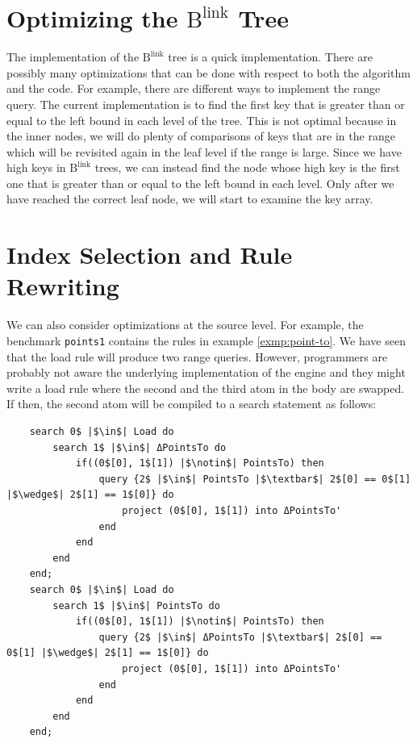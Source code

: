 \documentclass[11pt]{report}
\theoremstyle{definition}
\begin{document}
\section{Optimizing the $\text{B}^{\text{link}}$ Tree}

The implementation of the $\text{B}^{\text{link}}$ tree is a quick implementation. There are possibly many optimizations that can be done with respect to both the algorithm and the code. For example, there are different ways to implement the range query. The current implementation is to find the first key that is greater than or equal to the left bound in each level of the tree. This is not optimal because in the inner nodes, we will do plenty of comparisons of keys that are in the range which will be revisited again in the leaf level if the range is large. Since we have high keys in $\text{B}^{\text{link}}$ trees, we can instead find the node whose high key is the first one that is greater than or equal to the left bound in each level. Only after we have reached the correct leaf node, we will start to examine the key array.

\section{Index Selection and Rule Rewriting}

We can also consider optimizations at the source level. For example, the benchmark \texttt{points1} contains the rules in example \ref{exmp:point-to}. We have seen that the load rule will produce two range queries. However, programmers are probably not aware the underlying implementation of the engine and they might write a load rule where the second and the third atom in the body are swapped. If then, the second atom will be compiled to a search statement as follows:

\begin{verbatim}
    search 0$ |$\in$| Load do
        search 1$ |$\in$| ΔPointsTo do
            if((0$[0], 1$[1]) |$\notin$| PointsTo) then
                query {2$ |$\in$| PointsTo |$\textbar$| 2$[0] == 0$[1] |$\wedge$| 2$[1] == 1$[0]} do
                    project (0$[0], 1$[1]) into ΔPointsTo'
                end
            end
        end
    end;
    search 0$ |$\in$| Load do
        search 1$ |$\in$| PointsTo do
            if((0$[0], 1$[1]) |$\notin$| PointsTo) then
                query {2$ |$\in$| ΔPointsTo |$\textbar$| 2$[0] == 0$[1] |$\wedge$| 2$[1] == 1$[0]} do
                    project (0$[0], 1$[1]) into ΔPointsTo'
                end
            end
        end
    end;
\end{verbatim}
\end{document}
